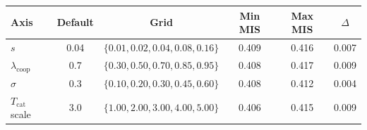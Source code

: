 \begin{tabular}{lccccc}\toprule
Axis & Default & Grid & Min MIS & Max MIS & $\Delta$ \\\midrule
$s$ & 0.04 & $\{0.01, 0.02, 0.04, 0.08, 0.16\}$ & 0.409 & 0.416 & 0.007 \\
$\lambda_{\text{coop}}$ & 0.7 & $\{0.30, 0.50, 0.70, 0.85, 0.95\}$ & 0.408 & 0.417 & 0.009 \\
$\sigma$ & 0.3 & $\{0.10, 0.20, 0.30, 0.45, 0.60\}$ & 0.408 & 0.412 & 0.004 \\
$T_{\text{cat}}$ scale & 3.0 & $\{1.00, 2.00, 3.00, 4.00, 5.00\}$ & 0.406 & 0.415 & 0.009 \\
\bottomrule
\end{tabular}
